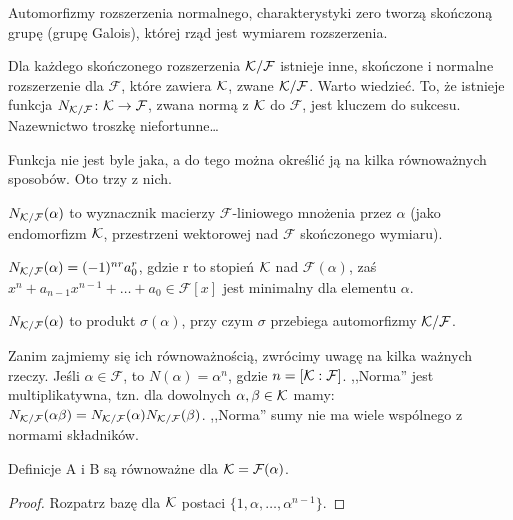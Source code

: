 Automorfizmy rozszerzenia normalnego, charakterystyki zero tworzą skończoną grupę (grupę Galois), której rząd jest wymiarem rozszerzenia.

Dla każdego skończonego rozszerzenia $\mathcal K/\mathcal F$ istnieje inne, skończone i normalne rozszerzenie dla $\mathcal F$, które zawiera $\mathcal K$, zwane  $\mathcal K/\mathcal F$.
Warto wiedzieć.
To, że istnieje funkcja  $N_{\mathcal K/\mathcal F} \colon \mathcal K \to \mathcal F$, zwana normą z $\mathcal K$ do $\mathcal F$, jest kluczem do sukcesu.
Nazewnictwo troszkę niefortunne\dots

Funkcja nie jest byle jaka, a do tego można określić ją na kilka równoważnych sposobów. Oto trzy z nich.

\begin{definicja}
	$N_{\mathcal K/ \mathcal F}(\alpha)$ to wyznacznik macierzy $\mathcal F$-liniowego mnożenia przez $\alpha$ (jako endomorfizm $\mathcal K$, przestrzeni wektorowej nad $\mathcal F$ skończonego wymiaru).
\end{definicja}

\begin{definicja}
	$N_{\mathcal K/\mathcal F}(\alpha) = (-1)^{nr} a_0^r$, gdzie r to stopień $\mathcal K$ nad $\mathcal F(\alpha)$, zaś $x^n + a_{n-1}x^{n-1} + \dots  + a_0 \in \mathcal F[x]$ jest minimalny dla elementu $\alpha$.
\end{definicja}

\begin{definicja} $N_{\mathcal K/\mathcal F}(\alpha)$ to produkt $\sigma(\alpha)$, przy czym $\sigma$ przebiega automorfizmy $\mathcal K / \mathcal F$.
\end{definicja}

Zanim zajmiemy się ich równoważnością, zwrócimy uwagę na kilka ważnych rzeczy.
Jeśli $\alpha \in \mathcal F$, to $N(\alpha) = \alpha^n$, gdzie $n = [\mathcal K : \mathcal F]$.
,,Norma'' jest multiplikatywna, tzn. dla dowolnych $\alpha, \beta \in \mathcal K$ mamy: $N_{\mathcal K / \mathcal F}(\alpha \beta) = N_{\mathcal K / \mathcal F}(\alpha) N_{\mathcal K / \mathcal F}(\beta)$.
,,Norma'' sumy nie ma wiele wspólnego z normami składników.

\begin{lemat}
	Definicje A i B są równoważne dla $\mathcal K = \mathcal F(\alpha)$.
\end{lemat}

\begin{proof}
	Rozpatrz bazę dla $\mathcal K$ postaci $\{1, \alpha, \dots, \alpha^{n-1}\}$.
\end{proof}

